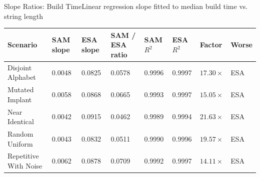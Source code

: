 \begin{benchmarktable}{Slope Ratios: Build Time}{Linear regression slope fitted to median build time vs. string length }
\begin{tabularx}{\textwidth}{|X|X|X|X|X|X|X|X|}
\toprule
Scenario & SAM slope & ESA slope & SAM / ESA ratio & SAM $R^2$ & ESA $R^2$ & Factor & Worse \\
\midrule
Disjoint Alphabet & 0.0048 & 0.0825 & 0.0578 & 0.9996 & 0.9997 & $17.30\times$ & ESA \\
\hline
Mutated Implant & 0.0058 & 0.0868 & 0.0665 & 0.9993 & 0.9997 & $15.05\times$ & ESA \\
\hline
Near Identical & 0.0042 & 0.0915 & 0.0462 & 0.9989 & 0.9994 & $21.63\times$ & ESA \\
\hline
Random Uniform & 0.0043 & 0.0832 & 0.0511 & 0.9990 & 0.9996 & $19.57\times$ & ESA \\
\hline
Repetitive With Noise & 0.0062 & 0.0878 & 0.0709 & 0.9992 & 0.9997 & $14.11\times$ & ESA \\
\bottomrule
\end{tabularx}
\end{benchmarktable}